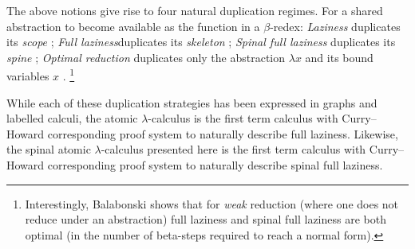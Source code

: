 \documentclass[a4paper,UKenglish,cleveref, autoref]{lipics-v2019}
\begin{document}
The above notions give rise to four natural duplication regimes. For a shared abstraction to become available as the function in a $\beta$-redex: \emph{Laziness} duplicates its \emph{scope} \cite{Launchbury1993, ariolafelleisen1997}; \emph{Full laziness}duplicates its \emph{skeleton} \cite{wadsworth1971semantics, Balabonski12, gundersen2013atomic}; \emph{Spinal full laziness} duplicates its \emph{spine} \cite{Blanc2005, blanc2007sharing}; \emph{Optimal reduction} duplicates only the abstraction $\lambda x$ and its bound variables $x$ \cite{lamping1989algorithm, van2004lambdascope}.%
\footnote{Interestingly, Balabonski \cite{Balabonski12} shows that for \emph{weak} reduction (where one does not reduce under an abstraction) full laziness and spinal full laziness are both optimal (in the number of beta-steps required to reach a normal form).}

While each of these duplication strategies has been expressed in graphs and labelled calculi, the atomic $\lambda$-calculus is the first term calculus with Curry--Howard corresponding proof system to naturally describe full laziness. Likewise, the spinal atomic $\lambda$-calculus presented here is the first term calculus with Curry--Howard corresponding proof system to naturally describe spinal full laziness.
\end{document}
